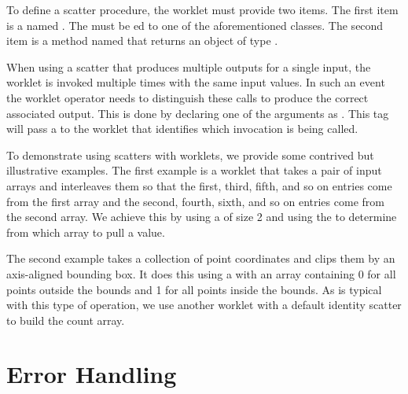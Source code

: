 To define a scatter procedure, the worklet must provide two items. The
first item is a  named \scattertype. The \scattertype
must be ed to one of the aforementioned
 classes. The second item is a 
method named  that returns an object of type
\scattertype.



When using a scatter that produces multiple outputs for a single input, the
worklet is invoked multiple times with the same input values. In such an
event the worklet operator needs to distinguish these calls to produce the
correct associated output. This is done by declaring one of the
\executionsignature arguments as . This tag will pass a
 to the worklet that identifies which invocation is being
called.


To demonstrate using scatters with worklets, we provide some contrived but
illustrative examples. The first example is a worklet that takes a pair of
input arrays and interleaves them so that the first, third, fifth, and so
on entries come from the first array and the second, fourth, sixth, and so
on entries come from the second array. We achieve this by using a
 of size 2 and using the  to
determine from which array to pull a value.


The second example takes a collection of point coordinates and clips them
by an axis-aligned bounding box. It does this using a
 with an array containing 0 for all points
outside the bounds and 1 for all points inside the bounds. As is typical
with this type of operation, we use another worklet with a default identity
scatter to build the count array.




\section{Error Handling}
\label{sec:ExecutionEnvironment:ErrorHandling}
\label{sec:Worklet:ErrorHandling}


